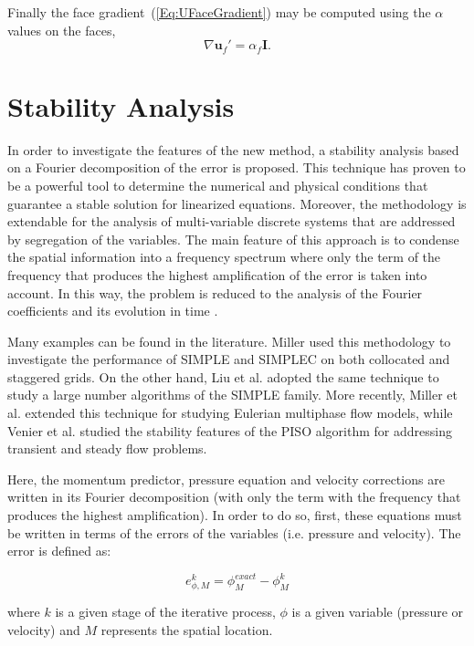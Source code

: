 \documentclass[final,3p,times,10pt,onecolumn]{myElsarticle}
\numberwithin{equation}{section}
\begin{document}
Finally the face gradient~(\ref{Eq:UFaceGradient}) may be computed using the $\alpha$ values on the faces,
\begin{equation}
\nabla \boldsymbol{u}_f'
=
\alpha_f
\boldsymbol{I}.
\end{equation}

\section{Stability Analysis}
\label{sec:fourier}

In order to investigate the features of the new method, a stability analysis based on a Fourier decomposition of the error is proposed. This technique has proven to be a powerful tool to determine the numerical and physical conditions that guarantee a stable solution for linearized equations. Moreover, the methodology is extendable for the analysis of multi-variable discrete systems that are addressed by segregation of the variables. The main feature of this approach is to condense the spatial information into a frequency spectrum where only the term of the frequency that produces the highest amplification of the error is taken into account. In this way, the problem is reduced to the analysis of the Fourier coefficients and its evolution in time \cite{hirsch}.

Many examples can be found in the literature. Miller \cite{miller} used this methodology to investigate the performance of SIMPLE and SIMPLEC on both collocated and staggered grids. On the other hand, Liu et al. \cite{liu} adopted the same technique to study a large number algorithms of the SIMPLE family. More recently, Miller et al. \cite{miller2} extended this technique for studying Eulerian multiphase flow models, while Venier et al. \cite{venier} studied the stability features of the PISO algorithm for addressing transient and steady flow problems.

Here, the momentum predictor, pressure equation and velocity corrections are written in its Fourier decomposition (with only the term with the frequency that produces the highest amplification). In order to do so, first, these equations must be written in terms of the errors of the variables (i.e. pressure and velocity). The error is defined as:

\begin{equation}
    e^k_{\phi,M} = \phi^{exact}_{M}-\phi_M^{k}
\end{equation}

\noindent where $k$ is a given stage of the iterative process, $\phi$ is a given variable (pressure or velocity) and $M$ represents the spatial location.
\end{document}
